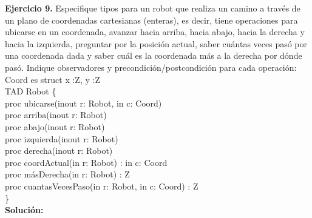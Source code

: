 \documentclass{article}
\begin{document}
\textbf{Ejercicio 9.} Especifique tipos para un robot que realiza un camino a trav\'es de un plano de coordenadas cartesianas (enteras),
es decir, tiene operaciones para ubicarse en un coordenada, avanzar hacia arriba, hacia abajo, hacia la derecha y hacia la
izquierda, preguntar por la posici\'on actual, saber cu\'antas veces pas\'o por una coordenada dada y saber cu\'al es la coordenada
m\'as a la derecha por d\'onde pas\'o. Indique observadores y precondici\'on/postcondici\'on para cada operaci\'on:
Coord es struct {x :Z, y :Z}\\
TAD Robot \{ \\
proc ubicarse(inout r: Robot, in c: Coord) \\
proc arriba(inout r: Robot) \\
proc abajo(inout r: Robot) \\
proc izquierda(inout r: Robot) \\
proc derecha(inout r: Robot) \\
proc coordActual(in r: Robot) : in c: Coord \\
proc m\'asDerecha(in r: Robot) : Z \\
proc cuantasVecesPaso(in r: Robot, in c: Coord) : Z \\
\}\\
\newpage
\textbf{Soluci\'on:}
\end{document}

